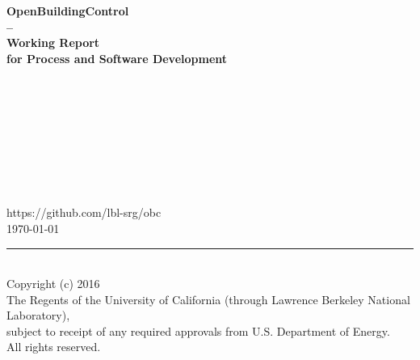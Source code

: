\begin{titlepage}
\begin{minipage}{\headwidth}
\begin{flushright}
\vspace{-1cm}
\large{~}
\\[5mm]
\hrulefill
\\[5mm]
 \Large\sffamily\bfseries{OpenBuildingControl}\\
 \Large\sffamily\bfseries{--}\\[3mm]
 \Large\sffamily\bfseries{Working Report}\\
 \Large\sffamily\bfseries{for Process and Software Development}
\\
\hrulefill
~\\[30mm]
\end{flushright}
\begin{center}
\large{~}\\
\large{~}\\
\large{~}\\
\large{~}\\
\large{~}\\
\large{~}\\
\large{~}\\
\large{https://github.com/lbl-srg/obc}
~\\[30mm]
\large{\today}
\\[50mm]
\end{center}
\hrule
~\\[2mm]
Copyright (c) 2016\\
The Regents of the University of California
(through Lawrence Berkeley National Laboratory),\\
subject to receipt of any required approvals from U.S. Department of Energy.\\
All rights reserved.
\end{minipage}
\end{titlepage}
